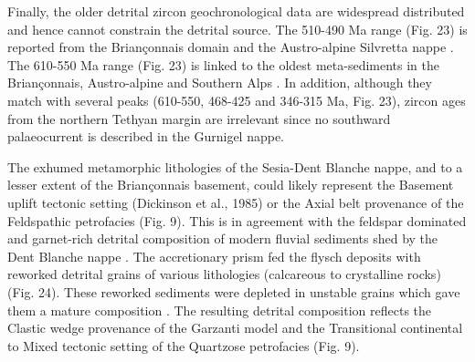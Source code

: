 \documentclass[twoside]{article}
\begin{document}
Finally, the older detrital zircon geochronological data are widespread distributed and hence cannot constrain the detrital source. The 510-490 Ma range (Fig. 23) is reported from the Briançonnais domain and the Austro-alpine Silvretta nappe \citep{Schaltegger1999}. The 610-550 Ma range (Fig. 23) is linked to the oldest meta-sediments in the Briançonnais, Austro-alpine and Southern Alps \citep{Schaltegger1999}. In addition, although they match with several peaks (610-550, 468-425 and 346-315 Ma, Fig. 23), zircon ages from the northern Tethyan margin are irrelevant since no southward palaeocurrent is described in the Gurnigel nappe.\par
\medskip
The exhumed metamorphic lithologies of the Sesia-Dent Blanche nappe, and to a lesser extent of the Briançonnais basement, could likely represent the Basement uplift tectonic setting (Dickinson et al., 1985) or the Axial belt provenance \citep{Garzanti2004,Garzanti2007b,Garzanti2010} of the Feldspathic petrofacies (Fig. 9). This is in agreement with the feldspar dominated and garnet-rich detrital composition of modern fluvial sediments shed by the Dent Blanche nappe \citep{Garzanti2010}. The accretionary prism fed the flysch deposits with reworked detrital grains of various lithologies (calcareous to crystalline rocks) (Fig. 24). These reworked sediments were depleted in unstable grains which gave them a mature composition \citep{Velbel1985}. The resulting detrital composition reflects the Clastic wedge provenance of the Garzanti model \citep{Garzanti2007b} and the Transitional continental to Mixed tectonic setting \citep{Dickinson1985} of the Quartzose petrofacies (Fig. 9).\par
\medskip

\end{document}

